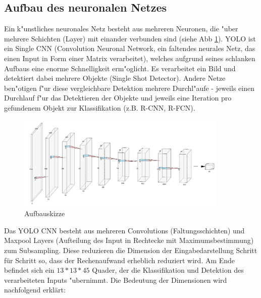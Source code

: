 \subsection{Aufbau des neuronalen Netzes}
\label{sec:cnn_aufbau}
Ein k"unstliches neuronales Netz besteht aus mehreren Neuronen, die "uber mehrere Schichten (Layer) mit einander verbunden sind (siehe Abb \ref{fig:neunet}). YOLO ist ein Single CNN (Convolution Neuronal Network, ein faltendes neurales Netz, das einen Input in Form einer Matrix verarbeitet),
welches aufgrund seines schlanken Aufbaus eine enorme Schnelligkeit erm"oglicht. Es verarbeitet ein Bild und detektiert dabei mehrere Objekte (Single Shot Detector). Andere Netze ben"otigen f"ur diese vergleichbare Detektion mehrere Durchl"aufe - jeweils einen Durchlauf f"ur das Detektieren der Objekte und jeweils eine Iteration pro gefundenem Objekt zur Klassifikation (z.B. R-CNN, R-FCN).

\begin{figure}[h]
	\centering
	\includegraphics[width=0.90\textwidth]{images/arch2}
	\caption{Aufbauskizze}
	\label{fig:neunet}
\end{figure}

Das YOLO CNN besteht aus mehreren Convolutions (Faltungsschichten) und Maxpool Layers (Aufteilung des Input in Rechtecke mit Maximumsbestimmung) zum Subsampling.
Diese reduzieren die Dimension der Eingabedarstellung Schritt f\"ur Schritt so,
dass der Rechenaufwand erheblich reduziert wird. Am Ende befindet sich ein $13*13*45$ Quader, der die Klassifikation und Detektion des verarbeiteten Inputs "ubernimmt. Die Bedeutung der Dimensionen wird nachfolgend erkl\"art:

